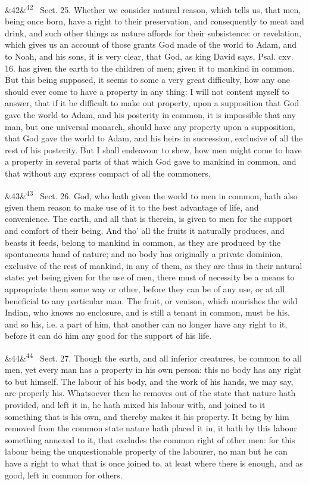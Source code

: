 \documentclass[12pt]{article}
\newcommand{\para}[1][]{\par\noindent\ifx&#1&\else\textsuperscript{\footnotesize #1}~\fi}
\begin{document}
\para[42] Sect. 25. Whether we consider natural reason, which tells us, that men, being once born, have a right to their preservation, and consequently to meat and drink, and such other things as nature affords for their subsistence: or revelation, which gives us an account of those grants God made of the world to Adam, and to Noah, and his sons, it is very clear, that God, as king David says, Psal. cxv. 16. has given the earth to the children of men; given it to mankind in common. But this being supposed, it seems to some a very great difficulty, how any one should ever come to have a property in any thing: I will not content myself to answer, that if it be difficult to make out property, upon a supposition that God gave the world to Adam, and his posterity in common, it is impossible that any man, but one universal monarch, should have any property upon a supposition, that God gave the world to Adam, and his heirs in succession, exclusive of all the rest of his posterity. But I shall endeavour to shew, how men might come to have a property in several parts of that which God gave to mankind in common, and that without any express compact of all the commoners.

\para[43] Sect. 26. God, who hath given the world to men in common, hath also given them reason to make use of it to the best advantage of life, and convenience. The earth, and all that is therein, is given to men for the support and comfort of their being. And tho' all the fruits it naturally produces, and beasts it feeds, belong to mankind in common, as they are produced by the spontaneous hand of nature; and no body has originally a private dominion, exclusive of the rest of mankind, in any of them, as they are thus in their natural state: yet being given for the use of men, there must of necessity be a means to appropriate them some way or other, before they can be of any use, or at all beneficial to any particular man. The fruit, or venison, which nourishes the wild Indian, who knows no enclosure, and is still a tenant in common, must be his, and so his, i.e. a part of him, that another can no longer have any right to it, before it can do him any good for the support of his life.

\para[44] Sect. 27. Though the earth, and all inferior creatures, be common to all men, yet every man has a property in his own person: this no body has any right to but himself. The labour of his body, and the work of his hands, we may say, are properly his. Whatsoever then he removes out of the state that nature hath provided, and left it in, he hath mixed his labour with, and joined to it something that is his own, and thereby makes it his property. It being by him removed from the common state nature hath placed it in, it hath by this labour something annexed to it, that excludes the common right of other men: for this labour being the unquestionable property of the labourer, no man but he can have a right to what that is once joined to, at least where there is enough, and as good, left in common for others.
\end{document}
